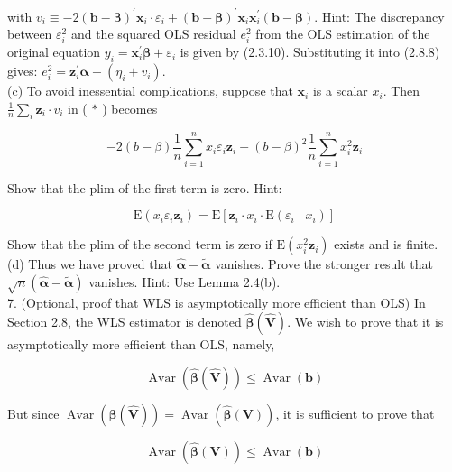 \documentclass[10pt]{article}
\begin{document}
with $v_{i} \equiv-2(\mathbf{b}-\boldsymbol{\beta})^{\prime} \mathbf{x}_{i} \cdot \varepsilon_{i}+(\mathbf{b}-\boldsymbol{\beta})^{\prime} \mathbf{x}_{i} \mathbf{x}_{i}^{\prime}(\mathbf{b}-\boldsymbol{\beta})$. Hint: The discrepancy between $\varepsilon_{i}^{2}$ and the squared OLS residual $e_{i}^{2}$ from the OLS estimation of the original equation $y_{i}=\mathbf{x}_{i}^{\prime} \boldsymbol{\beta}+\varepsilon_{i}$ is given by (2.3.10). Substituting it into (2.8.8) gives: $e_{i}^{2}=\mathbf{z}_{i}^{\prime} \boldsymbol{\alpha}+\left(\eta_{i}+v_{i}\right)$.\\
(c) To avoid inessential complications, suppose that $\mathbf{x}_{i}$ is a scalar $x_{i}$. Then $\frac{1}{n} \sum_{i} \mathbf{z}_{i} \cdot v_{i}$ in ( $*$ ) becomes


\begin{equation*}
-2(b-\beta) \frac{1}{n} \sum_{i=1}^{n} x_{i} \varepsilon_{i} \mathbf{z}_{i}+(b-\beta)^{2} \frac{1}{n} \sum_{i=1}^{n} x_{i}^{2} \mathbf{z}_{i} \tag{**}
\end{equation*}


Show that the plim of the first term is zero. Hint:

$$
\mathrm{E}\left(x_{i} \varepsilon_{i} \mathbf{z}_{i}\right)=\mathrm{E}\left[\mathbf{z}_{i} \cdot x_{i} \cdot \mathrm{E}\left(\varepsilon_{i} \mid x_{i}\right)\right]
$$

Show that the plim of the second term is zero if $\mathrm{E}\left(x_{i}^{2} \mathbf{z}_{i}\right)$ exists and is finite.\\
(d) Thus we have proved that $\hat{\boldsymbol{\alpha}}-\tilde{\boldsymbol{\alpha}}$ vanishes. Prove the stronger result that $\sqrt{n}(\hat{\boldsymbol{\alpha}}-\tilde{\boldsymbol{\alpha}})$ vanishes. Hint: Use Lemma 2.4(b).\\
7. (Optional, proof that WLS is asymptotically more efficient than OLS) In Section 2.8, the WLS estimator is denoted $\widehat{\boldsymbol{\beta}}(\widehat{\mathbf{V}})$. We wish to prove that it is asymptotically more efficient than OLS, namely,

$$
\operatorname{Avar}(\widehat{\boldsymbol{\beta}}(\widehat{\mathbf{V}})) \leq \operatorname{Avar}(\mathbf{b})
$$

But since $\operatorname{Avar}(\widehat{\boldsymbol{\beta}}(\widehat{\mathbf{V}}))=\operatorname{Avar}(\widehat{\boldsymbol{\beta}}(\mathbf{V}))$, it is sufficient to prove that

$$
\operatorname{Avar}(\widehat{\boldsymbol{\beta}}(\mathbf{V})) \leq \operatorname{Avar}(\mathbf{b})
$$
\end{document}
